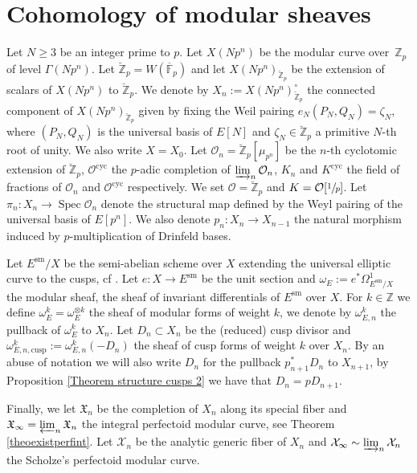 \documentclass[JEP,XML,SOM,Unicode,published]{cedram}
\newcommand{\cusp}{\mathrm{cusp}}
\newcommand{\cyc}{\mathrm{cyc}}
\newcommand{\sm}{\mathrm{sm}}
\numberwithin{equation}{section}
\theoremstyle{definition}
\newcommand{\bb}[1]{\mathbb{#1}}
\newcommand{\n}[1]{\mathcal{#1}}
\newcommand{\f}[1]{\mathfrak{#1}}
\DeclareMathOperator{\Spec}{Spec}
\begin{document}
\section{Cohomology of modular sheaves}
\label{COhomology of modular sheaves}

Let $N\geq 3$ be an integer prime to $p$. Let $X(Np^n)$ be the modular curve over~$\bb{Z}_p$ of level $\Gamma(Np^n)$. Let $\breve{\bb{Z}}_p=W(\overline{\bb{F}}_p)$ and let $X(Np^n)_{\breve{\bb{Z}}_p}$ be the extension of scalars of $X(Np^n)$ to $\breve{\bb{Z}}_p$. We denote by $X_n:=X(Np^n)^{\circ}_{\breve{\bb{Z}}_p}$ the connected component of $X(Np^n)_{\breve{\bb{Z}}_p}$ given by fixing the Weil pairing $e_{N}(P_N,Q_N)=\zeta_{N}$, where $(P_N,Q_N)$ is the universal basis of $E[N]$ and $\zeta_N\in \breve{\bb{Z}}_p$ a primitive $N$-th root of unity. We also write $X=X_0$. Let $\n{O}_n= \breve{\bb{Z}}_p[\mu_{p^n}]$ be the $n$-th cyclotomic extension of $\breve{\bb{Z}}_p$, $\n{O}^{\cyc}$ the $p$-adic completion of $\varinjlim_{n} \n{O}_n$, $K_n$ and $K^{\cyc}$ the field of fractions of $\n{O}_n$ and $\n{O}^{\cyc}$ respectively. We set $\n{O}=\breve{\bb{Z}}_p$ and $K=\n{O}[\sfrac{1}{p}]$. Let $\pi_n : X_n\to \Spec \n{O}_n$ denote the structural map defined by the Weyl pairing of the universal basis of $E[p^n]$. We also denote $p_n: X_n\to X_{n-1}$ the natural morphism induced by $p$-multiplication of Drinfeld bases.

Let $E^{\sm}/X$ be the semi-abelian scheme over $X$ extending the universal elliptic curve to the cusps, cf \cite{deligne1973schemas}. Let $e:X\to E^{\sm}$ be the unit section and $\omega_E:=e^* \Omega^1_{E^{\sm}/X}$ the modular sheaf, \ie the sheaf of invariant differentials of $E^{\sm}$ over $X$. For $k\in \bb{Z}$ we define $\omega_E^{k}= \omega_E^{\otimes k}$ the sheaf of modular forms of weight $k$, we denote by $\omega^k_{E,n}$ the pullback of $\omega_E^k$ to $X_n$. Let $D_n\subset X_n$ be the (reduced) cusp divisor and $\omega_{E,n,\cusp}^k:=\omega_{E,n}^k(-D_n)$ the sheaf of cusp forms of weight $k$ over $X_n$. By an abuse of notation we will also write $D_n$ for the pullback $p_{n+1}^* D_n$ to $X_{n+1}$, by Proposition \ref{Theorem structure cusps 2} we have that $D_{n}=p D_{n+1}$.

Finally, we let $\f{X}_n$ be the completion of $X_n$ along its special fiber and $\f{X}_{\infty}=\varprojlim_{n} \f{X}_n$ the integral perfectoid modular curve, see Theorem \ref{theoexistperfint}. Let $\n{X}_n$ be the analytic generic fiber of $X_n$ and $\n{X}_{\infty}\sim \varinjlim_n \n{X}_n$ the Scholze's perfectoid modular curve.
\end{document}

